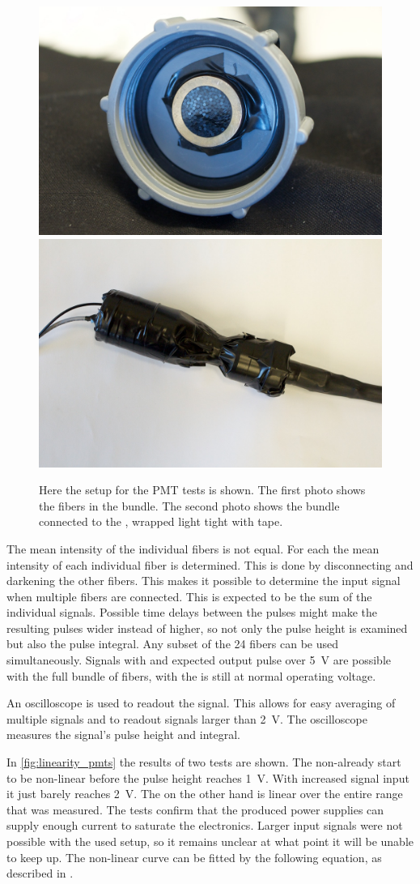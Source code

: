\begin{figure}
    \centering
    \includegraphics[width=.45\linewidth]{plots/detector/ARN_085351.jpg}
    \includegraphics[width=.45\linewidth]{plots/detector/ARN_085349.jpg}
    \caption{Here the setup for the PMT tests is shown. The first photo shows the fibers in the bundle. The second photo shows the bundle connected to the \pmt, wrapped light tight with tape.}
    \label{fig:pmt_test_setup}
\end{figure}

The mean intensity of the individual fibers is not equal. For each \pmt the mean intensity of each individual fiber is determined. This is done by disconnecting and darkening the other fibers. This makes it possible to determine the input signal when multiple fibers are connected. This is expected to be the sum of the individual signals. Possible time delays between the pulses might make the resulting pulses wider instead of higher, so not only the pulse height is examined but also the pulse integral. Any subset of the 24 fibers can be used simultaneously. Signals with and expected \pmt output pulse over \SI{5}{\volt} are possible with the full bundle of fibers, with the \pmt is still at normal operating voltage.

An oscilloscope is used to readout the \pmt signal. This allows for easy averaging of multiple signals and to readout signals larger than \SI{2}{\volt}. The oscilloscope measures the signal's pulse height and integral.

In \cref{fig:linearity_pmts} the results of two \pmt tests are shown. The non-\nikhef \pmt already start to be non-linear before the pulse height reaches \SI{1}{\volt}. With increased signal input it just barely reaches \SI{2}{\volt}. The \nikhef \pmt on the other hand is linear over the entire range that was measured. The tests confirm that the \nikhef produced \pmt power supplies can supply enough current to saturate the \hisparc electronics. Larger input signals were not possible with the used setup, so it remains unclear at what point it will be unable to keep up. The non-linear curve can be fitted by the following equation, as described in \cite{icecube2010pmt}.

